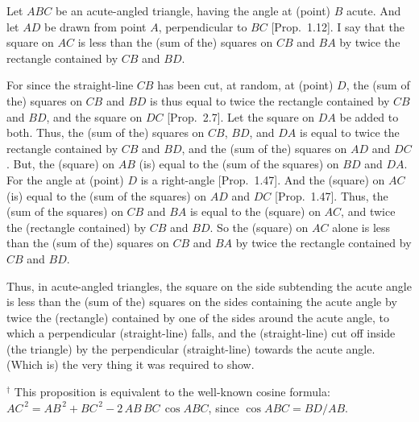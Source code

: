 \begin{Parallel}{}{}
{ \epsfysize=2in
\centerline{}

 Let $ABC$ be an acute-angled triangle, having the  angle at (point) $B$ acute.
 And let $AD$ be drawn from point $A$, perpendicular to $BC$ [Prop.~1.12].
I say that the square on $AC$ is less than the (sum of the) squares on $CB$ and $BA$ by twice the rectangle contained by $CB$ and $BD$.

For since the straight-line $CB$ has been cut, at random, at (point) $D$, the
(sum of the) squares on $CB$ and $BD$ is thus equal to twice the rectangle contained by $CB$ and $BD$, and the square on $DC$ [Prop.~2.7]. Let the
square on $DA$ be added to both. Thus, the (sum of the) squares on
$CB$, $BD$, and $DA$ is equal to twice  the rectangle contained by $CB$ and $BD$,
and the (sum of the) squares on $AD$ and $DC$. But, the (square) on $AB$ (is) equal to the (sum
of the squares) on $BD$ and $DA$. For the angle at (point) $D$ is a right-angle [Prop.~1.47]. And the (square) on $AC$ (is) equal to the (sum of the squares)
on $AD$ and $DC$ [Prop.~1.47]. Thus, the (sum of the squares) on $CB$ and $BA$
is equal to the (square) on  $AC$, and twice the (rectangle contained) by $CB$
and $BD$. So the (square) on $AC$ alone is less than the (sum of the) squares on
$CB$ and $BA$ by twice the rectangle contained by $CB$ and $BD$.

Thus, in acute-angled triangles, the square on the side subtending the acute angle
is less than the (sum of the) squares on the sides containing the acute
angle by twice the (rectangle) contained by one of the sides around the acute
angle, to which a perpendicular (straight-line) falls, and the 
 (straight-line) cut off inside (the triangle)
 by the perpendicular (straight-line) towards the acute angle. (Which is)
 the very thing it 	was required to show.}
\end{Parallel}
{\footnotesize \noindent$^\dag$ This proposition is equivalent
to the well-known cosine formula: $AC^{\,2} = AB^{\,2} + BC^{\,2} -2\,AB\, BC\,\cos ABC$, since $\cos ABC = BD / AB$.}

